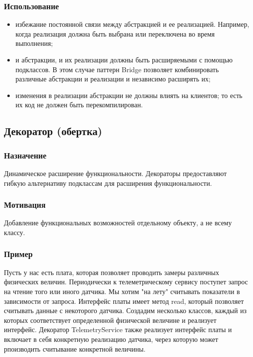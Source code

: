 \documentclass[10pt]{article}
\begin{document}
\subsubsection{Использование}
\begin{itemize}
	\item избежание постоянной связи между абстракцией и ее реализацией. Например, когда реализация должна быть выбрана или переключена во время выполнения;
	\item и абстракции, и их реализации должны быть расширяемыми с помощью подклассов. В этом случае паттерн Bridge позволяет комбинировать различные абстракции и реализации и независимо расширять их;
	\item изменения в реализации абстракции не должны влиять на клиентов; то есть их код не должен быть перекомпилирован.
\end{itemize}


\subsection{Декоратор (обертка)}
\subsubsection{Назначение}
Динамическое расширение функциональности. Декораторы предоставляют гибкую альтернативу подклассам для расширения функциональности.

\subsubsection{Мотивация}
Добавление функциональных возможностей отдельному объекту, а не всему классу.

\subsubsection{Пример}
Пусть у нас есть плата, которая позволяет проводить замеры различных физических величин.
Периодически к телеметрическому сервису поступет запрос на чтение того или иного датчика.
Мы хотим "на лету" считывать показатели в зависимости от запроса.
Интерфейс платы имеет метод read, который позволяет считывать данные с некоторого датчика.
Создадим несколько классов, каждый из которых соответствует определенной физической величине и реализует интерфейс.
Декоратор TelemetryService также реализует интерфейс платы и включает в себя конкретную реализацию датчика, через
которую может рпоизводить считывание конкретной величины.
\end{document}
